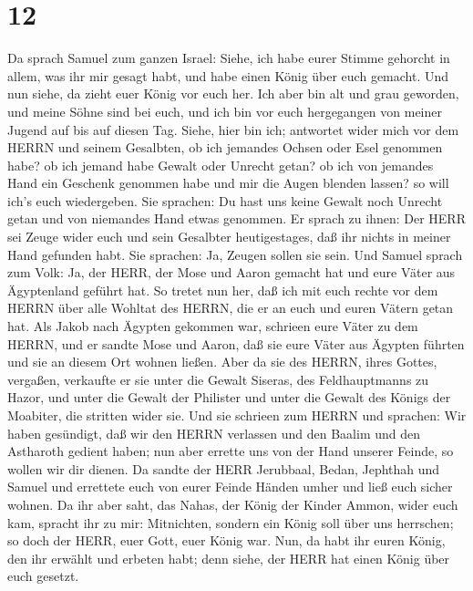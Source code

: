 \hypertarget{section-11}{%
\section{12}\label{section-11}}

 Da sprach Samuel zum ganzen Israel: Siehe, ich habe eurer
Stimme gehorcht in allem, was ihr mir gesagt habt, und habe einen König
über euch gemacht.  Und nun siehe, da zieht euer König vor
euch her. Ich aber bin alt und grau geworden, und meine Söhne sind bei
euch, und ich bin vor euch hergegangen von meiner Jugend auf bis auf
diesen Tag.  Siehe, hier bin ich; antwortet wider mich vor
dem HERRN und seinem Gesalbten, ob ich jemandes Ochsen oder Esel
genommen habe? ob ich jemand habe Gewalt oder Unrecht getan? ob ich von
jemandes Hand ein Geschenk genommen habe und mir die Augen blenden
lassen? so will ich's euch wiedergeben.  Sie sprachen: Du
hast uns keine Gewalt noch Unrecht getan und von niemandes Hand etwas
genommen.  Er sprach zu ihnen: Der HERR sei Zeuge wider euch
und sein Gesalbter heutigestages, daß ihr nichts in meiner Hand gefunden
habt. Sie sprachen: Ja, Zeugen sollen sie sein.  Und Samuel
sprach zum Volk: Ja, der HERR, der Mose und Aaron gemacht hat und eure
Väter aus Ägyptenland geführt hat.  So tretet nun her, daß
ich mit euch rechte vor dem HERRN über alle Wohltat des HERRN, die er an
euch und euren Vätern getan hat.  Als Jakob nach Ägypten
gekommen war, schrieen eure Väter zu dem HERRN, und er sandte Mose und
Aaron, daß sie eure Väter aus Ägypten führten und sie an diesem Ort
wohnen ließen.  Aber da sie des HERRN, ihres Gottes,
vergaßen, verkaufte er sie unter die Gewalt Siseras, des Feldhauptmanns
zu Hazor, und unter die Gewalt der Philister und unter die Gewalt des
Königs der Moabiter, die stritten wider sie.  Und sie
schrieen zum HERRN und sprachen: Wir haben gesündigt, daß wir den HERRN
verlassen und den Baalim und den Astharoth gedient haben; nun aber
errette uns von der Hand unserer Feinde, so wollen wir dir dienen.
 Da sandte der HERR Jerubbaal, Bedan, Jephthah und Samuel
und errettete euch von eurer Feinde Händen umher und ließ euch sicher
wohnen.  Da ihr aber saht, das Nahas, der König der Kinder
Ammon, wider euch kam, spracht ihr zu mir: Mitnichten, sondern ein König
soll über uns herrschen; so doch der HERR, euer Gott, euer König war.
 Nun, da habt ihr euren König, den ihr erwählt und erbeten
habt; denn siehe, der HERR hat einen König über euch gesetzt.

